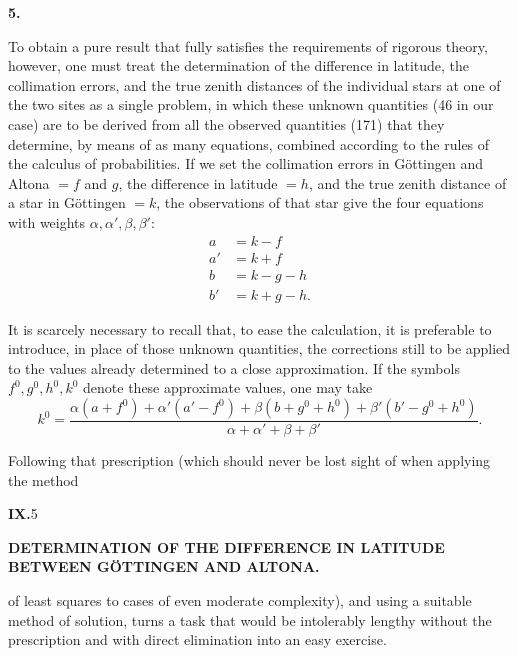 \begin{center}\textbf{5.}\end{center}

To obtain a pure result that fully satisfies the requirements of rigorous
theory, however, one must treat the determination of the difference in
latitude, the collimation errors, and the true zenith distances of the
individual stars at one of the two sites as a single problem, in which these unknown
quantities (46 in our case) are to be derived from all the observed quantities
(171) that they determine, by means of as many equations, combined according
to the rules of the calculus of probabilities. If we set the collimation errors
in Göttingen and Altona \(=f\) and \(g\), the difference in latitude \(=h\), and the
true zenith distance of a star in Göttingen \(=k\), the observations of
that star give the four equations with weights
\(\alpha,\alpha',\beta,\beta'\):
\[
\begin{aligned}
a&=k-f\\
a'&=k+f\\
b&=k-g-h\\
b'&=k+g-h.
\end{aligned}
\]

It is scarcely necessary to recall that, to ease the calculation, it is
preferable to introduce, in place of those unknown quantities, the corrections
still to be applied to the values already determined to a close approximation.
If the symbols \(f^0,g^0,h^0,k^0\) denote these approximate values,
one may take
\[
k^0=\frac{\alpha(a+f^0)+\alpha'(a'-f^0)+\beta(b+g^0+h^0)+\beta'(b'-g^0+h^0)}
{\alpha+\alpha'+\beta+\beta'}.
\]

Following that prescription (which should never be lost sight of when applying the method
\par\smallskip
\noindent\textbf{IX.}\hfill 5\hspace{.12\textwidth}\par

\par\clearpage
\noindent{}\parbox[t]{\dimexpr\linewidth-24mm\relax}{\centering\scriptsize\bfseries DETERMINATION OF THE DIFFERENCE IN LATITUDE BETWEEN GÖTTINGEN AND ALTONA.}\makebox[12mm][r]{}\par\medskip

\noindent of least squares to cases of even moderate complexity), and using
a suitable  method of solution, turns a task that would
be intolerably lengthy without the prescription and with direct elimination
into an easy exercise.

